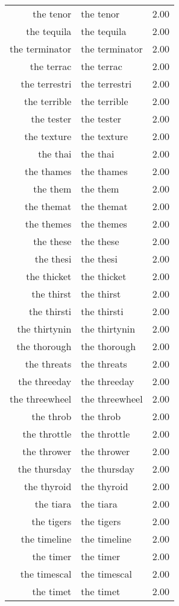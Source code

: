 \begin{table}[ht]
\begin{tabular}{rlr}
  the tenor & the tenor & 2.00 \\ 
  the tequila & the tequila & 2.00 \\ 
  the terminator & the terminator & 2.00 \\ 
  the terrac & the terrac & 2.00 \\ 
  the terrestri & the terrestri & 2.00 \\ 
  the terrible & the terrible & 2.00 \\ 
  the tester & the tester & 2.00 \\ 
  the texture & the texture & 2.00 \\ 
  the thai & the thai & 2.00 \\ 
  the thames & the thames & 2.00 \\ 
  the them & the them & 2.00 \\ 
  the themat & the themat & 2.00 \\ 
  the themes & the themes & 2.00 \\ 
  the these & the these & 2.00 \\ 
  the thesi & the thesi & 2.00 \\ 
  the thicket & the thicket & 2.00 \\ 
  the thirst & the thirst & 2.00 \\ 
  the thirsti & the thirsti & 2.00 \\ 
  the thirtynin & the thirtynin & 2.00 \\ 
  the thorough & the thorough & 2.00 \\ 
  the threats & the threats & 2.00 \\ 
  the threeday & the threeday & 2.00 \\ 
  the threewheel & the threewheel & 2.00 \\ 
  the throb & the throb & 2.00 \\ 
  the throttle & the throttle & 2.00 \\ 
  the thrower & the thrower & 2.00 \\ 
  the thursday & the thursday & 2.00 \\ 
  the thyroid & the thyroid & 2.00 \\ 
  the tiara & the tiara & 2.00 \\ 
  the tigers & the tigers & 2.00 \\ 
  the timeline & the timeline & 2.00 \\ 
  the timer & the timer & 2.00 \\ 
  the timescal & the timescal & 2.00 \\ 
  the timet & the timet & 2.00 \\ 

\end{tabular}
\end{table}
